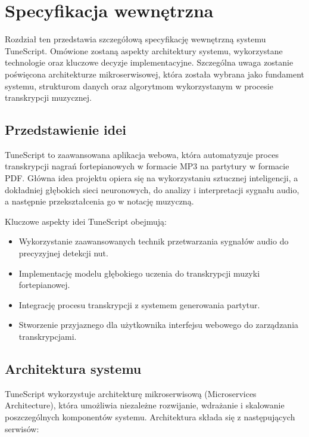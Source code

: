 \documentclass[a4paper,twoside,12pt]{book}
\begin{document}
\chapter{Specyfikacja wewnętrzna}
\label{ch:spec-wew}
Rozdział ten przedstawia szczegółową specyfikację wewnętrzną systemu TuneScript. Omówione zostaną aspekty architektury systemu, wykorzystane technologie oraz kluczowe decyzje implementacyjne. Szczególna uwaga zostanie poświęcona architekturze mikroserwisowej, która została wybrana jako fundament systemu, strukturom danych oraz algorytmom wykorzystanym w procesie transkrypcji muzycznej.


\section{Przedstawienie idei}

TuneScript to zaawansowana aplikacja webowa, która automatyzuje proces transkrypcji nagrań fortepianowych w formacie MP3 na partytury w formacie PDF. Główna idea projektu opiera się na wykorzystaniu sztucznej inteligencji, a dokładniej głębokich sieci neuronowych, do analizy i interpretacji sygnału audio, a następnie przekształcenia go w notację muzyczną.

Kluczowe aspekty idei TuneScript obejmują:

\begin{itemize}
	\item Wykorzystanie zaawansowanych technik przetwarzania sygnałów audio do precyzyjnej detekcji nut.
	\item Implementację modelu głębokiego uczenia do transkrypcji muzyki fortepianowej.
	\item Integrację procesu transkrypcji z systemem generowania partytur.
	\item Stworzenie przyjaznego dla użytkownika interfejsu webowego do zarządzania transkrypcjami.
\end{itemize}

\section{Architektura systemu}

TuneScript wykorzystuje architekturę mikroserwisową (Microservices Architecture), która umożliwia niezależne rozwijanie, wdrażanie i skalowanie poszczególnych komponentów systemu. Architektura składa się z następujących serwisów:
\end{document}
